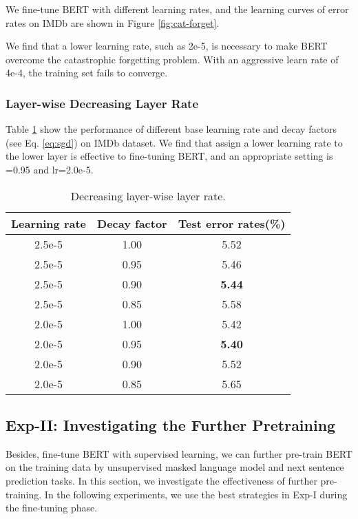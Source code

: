 \documentclass[11pt,a4paper]{article}
\theoremstyle{definition}
\begin{document}
\begin{CJK*}{UTF8}{gbsn}
We fine-tune BERT with different learning rates, and the learning curves of error rates on IMDb are shown in Figure \ref{fig:cat-forget}.

We find that a lower learning rate, such as 2e-5, is necessary to make BERT overcome the catastrophic forgetting problem. With an aggressive learn rate of 4e-4, the training set fails to converge.


\subsubsection{Layer-wise Decreasing Layer Rate}
Table \ref{tb:layer-wise-lr} show the performance of different base learning rate and decay factors (see Eq. \eqref{eq:sgd}) on IMDb dataset. We find that assign a lower learning rate to the lower layer is effective to fine-tuning BERT, and an appropriate setting is =0.95 and lr=2.0e-5.

\begin{table}[h!]\small
\centering
\begin{tabular}{c c c}
	\toprule
	Learning rate & Decay factor  & Test error rates(\%) \\
	\midrule
	2.5e-5 & 1.00 & 5.52 \\
	2.5e-5 & 0.95 & 5.46 \\
    2.5e-5 & 0.90 & \textbf{5.44} \\
    2.5e-5 & 0.85 & 5.58 \\
    \midrule
    2.0e-5 & 1.00 & 5.42 \\
    2.0e-5 & 0.95 & \textbf{5.40} \\
    2.0e-5 & 0.90 & 5.52 \\
    2.0e-5 & 0.85 & 5.65 \\
	\bottomrule
\end{tabular}
\caption{Decreasing layer-wise layer rate.
}\label{tb:layer-wise-lr}
\end{table}






\subsection{Exp-II: Investigating the Further Pretraining}\label{sec:exp-pretrain}

Besides, fine-tune BERT with supervised learning, we can further pre-train BERT on the training data by unsupervised masked language model and next sentence prediction tasks.
In this section, we investigate the effectiveness of further pre-training. In the following experiments, we use the best strategies in Exp-I during the fine-tuning phase.


\end{CJK*}
\end{document}
